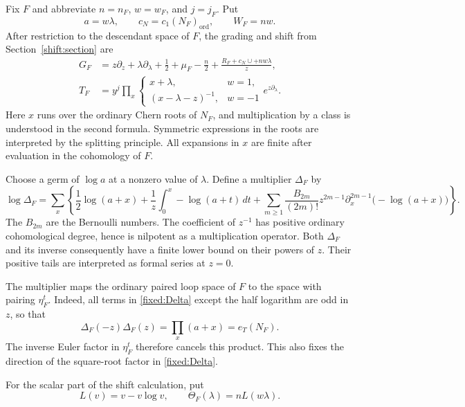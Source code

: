 Fix $F$ and abbreviate $n=n_F$, $w=w_F$, and $j=j_F$.  Put
\[
 a=w\lambda,\qquad c_N=c_1(N_F)_{\mathrm{ord}},\qquad W_F=nw.
\]
After restriction to the descendant space of $F$, the grading and shift
from Section~\ref{shift:section} are
\begin{align}
 G_F&=z\partial_z+\lambda\partial_\lambda+
        \frac12+\mu_F-\frac n2+
        \frac{R_F+c_N\cup+nw\lambda}{z},
       \label{fixed:restricted-grading}\\
 T_F&=y^j\prod_x
       \begin{cases}
        x+\lambda,&w=1,\\
        (x-\lambda-z)^{-1},&w=-1
       \end{cases}
       e^{z\partial_\lambda}.
       \label{fixed:restricted-shift}
\end{align}
Here $x$ runs over the ordinary Chern roots of $N_F$, and multiplication
by a class is understood in the second formula.  Symmetric expressions
in the roots are interpreted by the splitting principle.  All expansions
in $x$ are finite after evaluation in the cohomology of $F$.

Choose a germ of $\log a$ at a nonzero value of $\lambda$.  Define a
multiplier $\Delta_F$ by
\begin{equation}\label{fixed:Delta}
 \log\Delta_F=
 \sum_x\left\{
   \frac12\log(a+x)
   +\frac1z\int_0^x-\log(a+t)\,dt
   +\sum_{m\geq1}\frac{B_{2m}}{(2m)!}z^{2m-1}
       \partial_x^{2m-1}\bigl(-\log(a+x)\bigr)
          \right\}.
\end{equation}
The $B_{2m}$ are the Bernoulli numbers.  The coefficient of $z^{-1}$ has
positive ordinary cohomological degree, hence is nilpotent as a
multiplication operator.  Both $\Delta_F$ and its inverse consequently
have a finite lower bound on their powers of $z$.  Their positive tails
are interpreted as formal series at $z=0$.

The multiplier maps the ordinary paired loop space of $F$ to the space
with pairing $\eta_F^t$.  Indeed, all terms in
\eqref{fixed:Delta} except the half logarithm are odd in $z$, so that
\[
 \Delta_F(-z)\Delta_F(z)=\prod_x(a+x)=e_T(N_F).
\]
The inverse Euler factor in $\eta_F^t$ therefore cancels this product.
This also fixes the direction of the square-root factor in
\eqref{fixed:Delta}.

For the scalar part of the shift calculation, put
\begin{equation}\label{fixed:primitive}
 L(v)=v-v\log v,\qquad
 \Theta_F(\lambda)=nL(w\lambda).
\end{equation}

